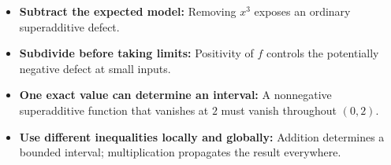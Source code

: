 \begin{takeaways}
\begin{itemize}
\item \textbf{Subtract the expected model:} Removing \(x^3\) exposes an ordinary superadditive defect.
\item \textbf{Subdivide before taking limits:} Positivity of \(f\) controls the potentially negative defect at small inputs.
\item \textbf{One exact value can determine an interval:} A nonnegative superadditive function that vanishes at \(2\) must vanish throughout \((0,2)\).
\item \textbf{Use different inequalities locally and globally:} Addition determines a bounded interval; multiplication propagates the result everywhere.
\end{itemize}
\end{takeaways}
